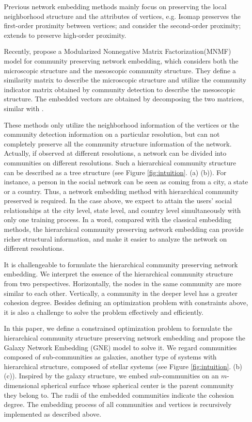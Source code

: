 \documentclass{article}
\theoremstyle{definition}
\begin{document}
		Previous network embedding methods mainly focus on preserving the local neighborhood structure and the attributes of vertices, e.g. Isomap \cite{Tenenbaum2000A} preserves the first-order proximity between vertices; \cite{Tang2015LINE} and \cite{Wang2016Structural} consider the second-order proximity; \cite{Cao2015GraRep} extends to preserve high-order proximity.  
		
		Recently, \cite{Wang2017Community} propose a Modularized Nonnegative Matrix Factorization(MNMF) model for community preserving network embedding, which considers both the microscopic structure and the mesoscopic community structure. They define a similarity matrix to describe the microscopic structure and utilize the community indicator matrix obtained by community detection to describe the mesoscopic structure. The embedded vectors are obtained by decomposing the two matrices, similar with \cite{Yang2015Network}.
        
		These methods only utilize the neighborhood information of the vertices or the community detection information on a particular resolution, but can not completely preserve all the community structure information of the network. Actually, if observed at different resolutions, a network can be divided into communities on different resolutions. Such a hierarchical community structure can be described as a tree structure (see Figure \ref{fig:intuition}. (a) (b)). For instance, a person in the social network can be seen as coming from a city, a state or a country. Thus, a network embedding method with hierarchical community preserved is required. In the case above, we expect to attain the users' social relationships at the city level, state level, and country level simultaneously with only one training process. In a word, compared with the classical embedding methods, the hierarchical community preserving network embedding can provide richer structural information, and make it easier to analyze the network on different resolutions.

		It is challengeable to formulate the hierarchical community preserving network embedding. 
		We interpret the essence of the hierarchical community structure from two perspectives. 
		Horizontally, the nodes in the same community are more similar to each other. Vertically, a community in the deeper level has a greater cohesion degree. Besides defining an optimization problem with constraints above, it is also a challenge to solve the problem effectively and efficiently.

		In this paper, we define a constrained optimization problem to formulate the hierarchical community structure preserving network embedding and propose the Galaxy Network Embedding (GNE) model to solve it. We regard communities composed of sub-communities as galaxies, another type of systems with hierarchical structure, composed of stellar systems (see Figure \ref{fig:intuition}. (b) (c)). Inspired by the galaxy structure, we embed sub-communities on an $m$-dimensional spherical surface whose spherical center is the parent community they belong to. The radii of the embedded communities indicate the cohesion degree. The embedding process of all communities and vertices is recursively implemented as described above.
		
\end{document}
